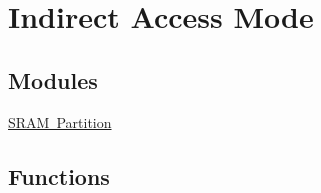 \hypertarget{group__ALT__QSPI__INDAC}{}\section{Indirect Access Mode}
\label{group__ALT__QSPI__INDAC}
\subsection*{Modules}
\begin{DoxyCompactItemize}
\item 
\mbox{\hyperlink{group__ALT__QSPI__CFG__SRAM}{S\+R\+A\+M Partition}}
\end{DoxyCompactItemize}
\subsection*{Functions}
